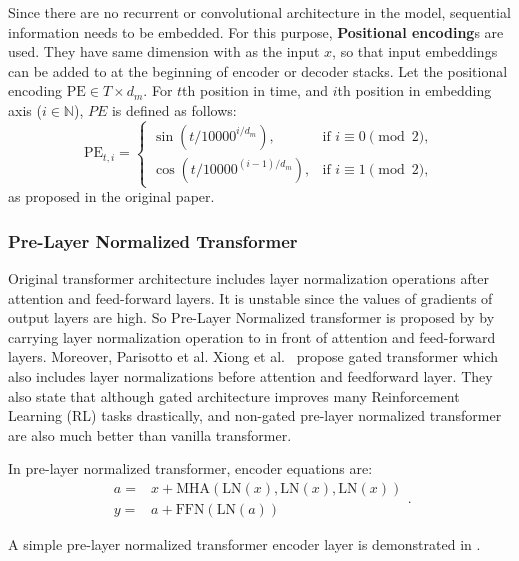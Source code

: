 Since there are no recurrent or convolutional architecture in the model, sequential information needs to be embedded. 
For this purpose, \textbf{Positional encoding}s are used. 
They have same dimension with as the input $x$, so that input embeddings can be added to at the beginning of encoder or decoder stacks. 
Let the positional encoding $\mathrm{PE} \in {T \times d_m}$.
For $t$th position in time, and $i$th position in embedding axis ($i \in \mathbb{N}$), $PE$ is defined as follows: 
\begin{equation}
\mathrm{PE}_{t,i} = 
\begin{cases}
\sin(t/10000^{i/d_m}),   & \text{if } i \equiv 0 \pmod 2 ,\\
\cos(t/10000^{(i-1)/d_m}),   & \text{if } i \equiv 1 \pmod 2 ,
\end{cases}
\end{equation}
as proposed in the original paper. 

\subsubsection{Pre-Layer Normalized Transformer}

Original transformer architecture includes layer normalization operations after attention and feed-forward layers. 
It is unstable since the values of gradients of output layers are high. 
So Pre-Layer Normalized transformer is proposed by \cite{xiong_layer_2020} by carrying layer normalization operation to in front of attention and feed-forward layers. 
Moreover, Parisotto et al. Xiong et al.~ \cite{parisotto_stabilizing_2019} propose gated transformer which also includes layer normalizations before attention and feedforward layer. 
They also state that although gated architecture improves many Reinforcement Learning (RL) tasks drastically, and non-gated pre-layer normalized transformer are also much better than vanilla transformer. 

In pre-layer normalized transformer, encoder equations are: 
\begin{equation}
\begin{split}
a = & x+ \mathrm{MHA}(\mathrm{LN}(x),\mathrm{LN}(x),\mathrm{LN}(x)) \\
y = & a + \mathrm{FFN}(\mathrm{LN}(a))
\end{split}.
\end{equation}

A simple pre-layer normalized transformer encoder layer is demonstrated in .

